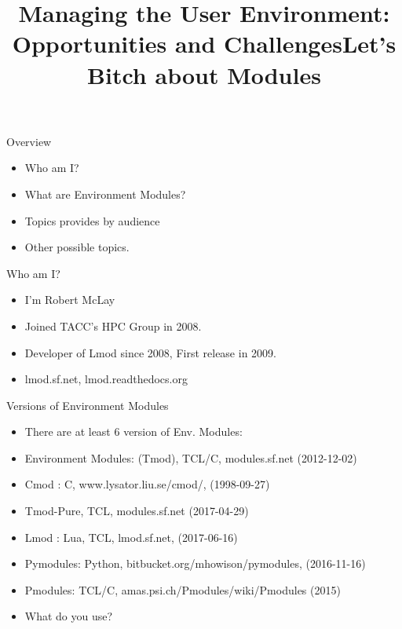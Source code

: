 \documentclass{beamer}
\begin{document}
\title[User Environment]{Managing the User Environment: Opportunities and Challenges}
\frame{\titlepage} 

\title[User Environment]{Let's Bitch about Modules}

\frame{\titlepage} 

\begin{frame}{Overview}
  \begin{itemize}
    \item Who am I?
    \item What are Environment Modules?
    \item Topics provides by audience
    \item Other possible topics.
  \end{itemize}
\end{frame}

\begin{frame}{Who am I?}
  \begin{itemize}
    \item I'm Robert McLay
    \item Joined TACC's HPC Group in 2008.
    \item Developer of Lmod since 2008, First release in 2009.
    \item lmod.sf.net, lmod.readthedocs.org
  \end{itemize}
\end{frame}

\begin{frame}{Versions of Environment Modules}
  \begin{itemize}
    \item There are at least 6 version of Env. Modules:
    \item Environment Modules: (Tmod), TCL/C, modules.sf.net (2012-12-02)
    \item Cmod : C, www.lysator.liu.se/cmod/, (1998-09-27)
    \item Tmod-Pure, TCL, modules.sf.net (2017-04-29)
    \item Lmod : Lua, TCL, lmod.sf.net, (2017-06-16)
    \item Pymodules: Python, bitbucket.org/mhowison/pymodules, 
      (2016-11-16)
    \item Pmodules: TCL/C, amas.psi.ch/Pmodules/wiki/Pmodules (2015)
    \item What do you use?
  \end{itemize}
\end{frame}
\end{document}

